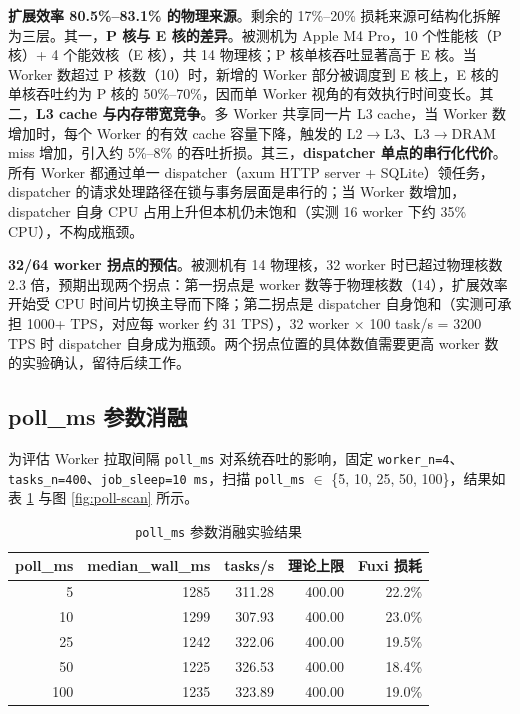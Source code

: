 \textbf{扩展效率 80.5\%--83.1\% 的物理来源}。剩余的 17\%--20\% 损耗来源可结构化拆解为三层。其一，\textbf{P 核与 E 核的差异}。被测机为 Apple M4 Pro，10 个性能核（P 核）+ 4 个能效核（E 核），共 14 物理核；P 核单核吞吐显著高于 E 核。当 Worker 数超过 P 核数（10）时，新增的 Worker 部分被调度到 E 核上，E 核的单核吞吐约为 P 核的 50\%--70\%，因而单 Worker 视角的有效执行时间变长。其二，\textbf{L3 cache 与内存带宽竞争}。多 Worker 共享同一片 L3 cache，当 Worker 数增加时，每个 Worker 的有效 cache 容量下降，触发的 L2$\to$L3、L3$\to$DRAM miss 增加，引入约 5\%--8\% 的吞吐折损。其三，\textbf{dispatcher 单点的串行化代价}。所有 Worker 都通过单一 dispatcher（axum HTTP server + SQLite）领任务，dispatcher 的请求处理路径在锁与事务层面是串行的；当 Worker 数增加，dispatcher 自身 CPU 占用上升但本机仍未饱和（实测 16 worker 下约 35\% CPU），不构成瓶颈。

\textbf{32/64 worker 拐点的预估}。被测机有 14 物理核，32 worker 时已超过物理核数 2.3 倍，预期出现两个拐点：第一拐点是 worker 数等于物理核数（14），扩展效率开始受 CPU 时间片切换主导而下降；第二拐点是 dispatcher 自身饱和（实测可承担 1000+ TPS，对应每 worker 约 31 TPS），32 worker × 100 task/s = 3200 TPS 时 dispatcher 自身成为瓶颈。两个拐点位置的具体数值需要更高 worker 数的实验确认，留待后续工作。

\subsection{poll\_ms 参数消融}

为评估 Worker 拉取间隔 \texttt{poll\_ms} 对系统吞吐的影响，固定 \texttt{worker\_n=4}、\texttt{tasks\_n=400}、\texttt{job\_sleep=10 ms}，扫描 \texttt{poll\_ms} $\in$ \{5, 10, 25, 50, 100\}，结果如表 \ref{tab:poll-scan} 与图 \ref{fig:poll-scan} 所示。

\begin{table}[H]
\centering
\caption{\texttt{poll\_ms} 参数消融实验结果}
\label{tab:poll-scan}
\begin{tabular}{rrrrr}
\toprule
poll\_ms & median\_wall\_ms & tasks/s & 理论上限 & Fuxi 损耗 \\
\midrule
5 & 1285 & 311.28 & 400.00 & 22.2\% \\
10 & 1299 & 307.93 & 400.00 & 23.0\% \\
25 & 1242 & 322.06 & 400.00 & 19.5\% \\
50 & 1225 & 326.53 & 400.00 & 18.4\% \\
100 & 1235 & 323.89 & 400.00 & 19.0\% \\
\bottomrule
\end{tabular}
\end{table}

